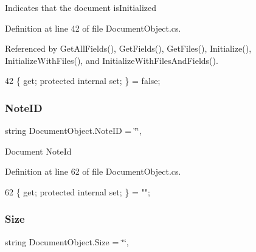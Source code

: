 Indicates that the document is\+Initialized 



Definition at line 42 of file Document\+Object.\+cs.



Referenced by Get\+All\+Fields(), Get\+Fields(), Get\+Files(), Initialize(), Initialize\+With\+Files(), and Initialize\+With\+Files\+And\+Fields().


\begin{DoxyCode}
42 \{ \textcolor{keyword}{get}; \textcolor{keyword}{protected} \textcolor{keyword}{internal} \textcolor{keyword}{set}; \} = \textcolor{keyword}{false};
\end{DoxyCode}
\mbox{\label{class_document_object_ac447461e3dc7f8258695f902ef0758a7}} 
\subsubsection{\texorpdfstring{Note\+ID}{NoteID}}
{\footnotesize\ttfamily string Document\+Object.\+Note\+ID = \char`\"{}\char`\"{}\hspace{0.3cm}{\ttfamily [get]}, {\ttfamily [set]}}



Document Note\+Id 



Definition at line 62 of file Document\+Object.\+cs.


\begin{DoxyCode}
62 \{ \textcolor{keyword}{get}; \textcolor{keyword}{protected} \textcolor{keyword}{internal} \textcolor{keyword}{set}; \} = \textcolor{stringliteral}{""};
\end{DoxyCode}
\mbox{\label{class_document_object_abdc1a6dfc1bb2261b523cf94468448b9}} 
\subsubsection{\texorpdfstring{Size}{Size}}
{\footnotesize\ttfamily string Document\+Object.\+Size = \char`\"{}\char`\"{}\hspace{0.3cm}{\ttfamily [get]}, {\ttfamily [set]}}



